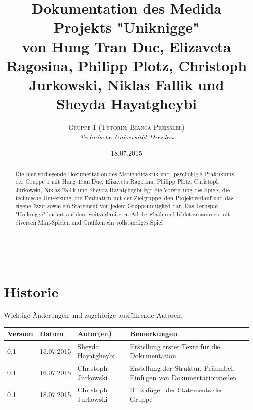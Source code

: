 \documentclass[a4paper, 11pt]{article} %
\title{\textbf{Dokumentation des Medida Projekts "Uniknigge"}\\ %
von Hung Tran Duc, Elizaveta Ragosina, Philipp Plotz, Christoph Jurkowski, Niklas Fallik und Sheyda Hayatgheybi} %
\author{\textsc{Gruppe 1 (Tutorin: Bianca Preißler)} %
\\{\textit{Technische Universität Dresden}}} %
\date{18.07.2015} %
\makeatletter
\renewcommand{\maketitle}{ %
\begin{flushright} %
{\LARGE\@title} %

\vspace{50pt} %

{\large\@author} %
\\\@date %

\vspace{40pt} %
\end{flushright}
}
\makeatother
\begin{document}
\maketitle %


\renewcommand{\abstractname}{Präambel} %

\vspace{5cm} %


\begin{abstract}
\noindent
Die hier vorliegende Dokumentation des Mediendidaktik und -psychologie Praktikums der Gruppe 1 mit Hung Tran Duc, Elizaveta Ragosina, Philipp Plotz, Christoph Jurkowski, Niklas Fallik und Sheyda Hayatgheybi legt die Vorstellung des Spiels, die technische Umsetzung, die Evaluation mit der Zielgruppe, den Projektverlauf
und das eigene Fazit sowie ein Statement von jedem Gruppenmitglied dar. Das Lernspiel "Uniknigge" basiert auf dem weitverbreiteten Adobe Flash und bildet zusammen mit diversen Mini-Spielen und Grafiken ein vollständiges Spiel.
\end{abstract}


\newpage 
\section*{Historie}
Wichtige Änderungen und zugehörige ausführende Autoren.\\
\begin{tabular}{|lllp{5.5cm}|}
\hline 
\textbf{Version} & \textbf{Datum} & \textbf{Autor(en)} & \textbf{Bemerkungen} \\ 
\hline 
0.1 & 15.07.2015 & Sheyda Hayatgheybi & \nohyphens{Erstellung erster Texte für die Dokumentation} \\ 
\hline
0.1 & 16.07.2015 & Christoph Jurkowski & \nohyphens{Erstellung der Struktur, Präambel, Einfügen von Dokumentationsteilen} \\ 
\hline
0.1 & 18.07.2015 & Christoph Jurkowski & \nohyphens{Hinzufügen der Statements der Gruppe} \\ 
\hline
\end{tabular} 
\end{document}
